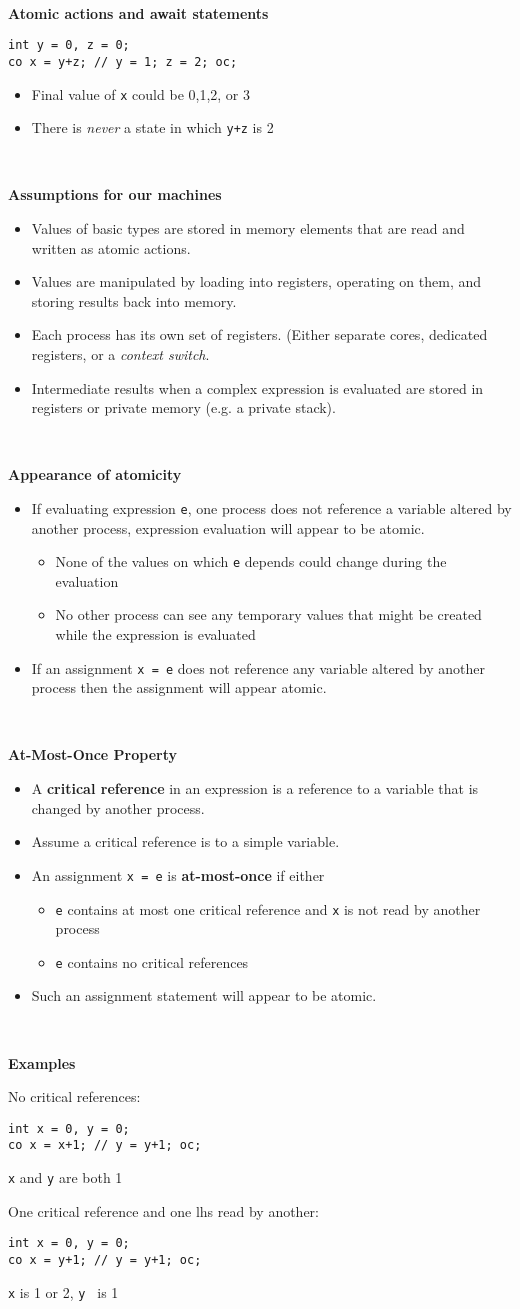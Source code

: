\documentclass{article}
\newcommand{\bi}{\begin{itemize}}
\newcommand{\ii}{\item}
\newcommand{\ei}{\end{itemize}}
\newcommand{\ti}[1]{
\mbox{~}

\vspace{1.25in}
\centerline{\bf #1}}
\begin{document}
\ti{Atomic actions and await statements}
\begin{verbatim}
int y = 0, z = 0;
co x = y+z; // y = 1; z = 2; oc;
\end{verbatim}
\bi
\ii Final value of {\tt x} could be 0,1,2, or 3
\ii There is {\em never} a state in which {\tt y+z} is 2
\ei

\newpage
\ti{Assumptions for our machines}
\bi
\ii Values of basic types are stored in memory elements that are read
and written as atomic actions.
\ii Values are manipulated by loading into registers, operating on
them, and storing results back into memory.
\ii Each process has its own set of registers.  (Either separate
cores, dedicated registers, or a {\em context switch}.
\ii Intermediate results when a complex expression is evaluated are
stored in registers or private memory (e.g. a private stack).
\ei

\newpage
\ti{Appearance of atomicity}
\bi
\ii If evaluating expression {\tt e}, one process does not reference a
variable altered by another process, expression evaluation will appear
to be atomic.
\bi
\ii None of the values on which {\tt e} depends could change during
the evaluation
\ii No other process can see any temporary values that might be
created while the expression is evaluated
\ei
\ii If an assignment {\tt x = e} does not reference any variable
altered by another process then the assignment will appear atomic.
\ei

\newpage
\ti{At-Most-Once Property}
\bi
\ii A {\bf critical reference} in an expression is a reference to a
variable that is changed by another process.
\ii Assume a critical reference is to a simple variable.
\ii An assignment {\tt x = e} is {\bf at-most-once} if either
\bi
\ii {\tt e} contains at most one critical reference and {\tt x} is not
read by another process
\ii {\tt e} contains no critical references
\ei
\ii Such an assignment statement will appear to be atomic.
\ei

\newpage
\ti{Examples}
No critical references:
\begin{verbatim}
int x = 0, y = 0;
co x = x+1; // y = y+1; oc;
\end{verbatim}
{\tt x} and {\tt y} are both 1

\vspace{1in}

One critical reference and one lhs read by another:
\begin{verbatim}
int x = 0, y = 0;
co x = y+1; // y = y+1; oc;
\end{verbatim}
{\tt x} is 1 or 2, {\tt y } is 1
\end{document}
